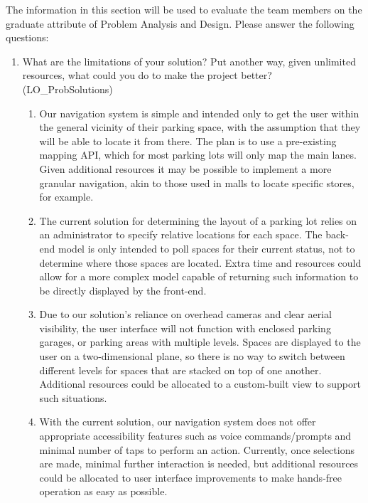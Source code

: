 \documentclass[12pt, titlepage]{article}
\begin{document}
The information in this section will be used to evaluate the team members on the
graduate attribute of Problem Analysis and Design.  Please answer the following
questions:

\begin{enumerate}
  \item What are the limitations of your solution?  Put another way, given
  unlimited resources, what could you do to make the project better?
  (LO\_ProbSolutions)
  
  \begin{enumerate}
  \item Our navigation system is simple and intended only to get the user within
  the general vicinity of their parking space, with the assumption that they
  will be able to locate it from there. The plan is to use a pre-existing
  mapping API, which for most parking lots will only map the main lanes. Given
  additional resources it may be possible to implement a more granular
  navigation, akin to those used in malls to locate specific stores, for
  example.
  
  \item The current solution for determining the layout of a parking lot relies
  on an administrator to specify relative locations for each space. The back-end
  model is only intended to poll spaces for their current status, not to
  determine where those spaces are located. Extra time and resources could allow
  for a more complex model capable of returning such information to be directly
  displayed by the front-end.

  \item Due to our solution's reliance on overhead cameras and clear aerial
  visibility, the user interface will not function with enclosed parking
  garages, or parking areas with multiple levels. Spaces are displayed to the
  user on a two-dimensional plane, so there is no way to switch between
  different levels for spaces that are stacked on top of one another. Additional
  resources could be allocated to a custom-built view to support such
  situations.

  \item With the current solution, our navigation system does not offer
  appropriate accessibility features such as voice commands/prompts and minimal
  number of taps to perform an action. Currently, once selections are made,
  minimal further interaction is needed, but additional resources could be
  allocated to user interface improvements to make hands-free operation as easy
  as possible.


\end{enumerate}
\end{enumerate}
\end{document}
